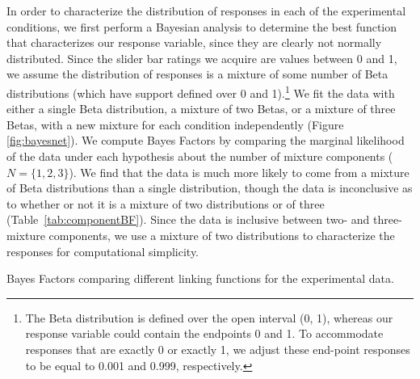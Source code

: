 \documentclass[10pt,letterpaper]{article}
\begin{document}
In order to characterize the distribution of responses in each of the experimental conditions, we first perform a Bayesian analysis to determine the best function that characterizes our response variable, since they are clearly not normally distributed.
Since the slider bar ratings we acquire are values between 0 and 1, we assume the distribution of responses is a mixture of some number of Beta distributions (which have support defined over 0 and 1).\footnote{The Beta distribution is defined over the open interval (0, 1), whereas our response variable could contain the endpoints 0 and 1. To accommodate responses that are exactly 0 or exactly 1, we adjust these end-point responses to be equal to 0.001 and 0.999, respectively.}
We fit the data with either a single Beta distribution, a mixture of two Betas, or a mixture of three Betas, with a new mixture for each condition independently (Figure \ref{fig:bayesnet}). 
We compute Bayes Factors by comparing the marginal likelihood of the data under each hypothesis about the number of mixture components ($N = \{1, 2, 3\}$).
We find that the data is much more likely to come from a mixture of Beta distributions than a single distribution, though the data is inconclusive as to whether or not it is a mixture of two distributions or of three (Table~\ref{tab:componentBF}). 
Since the data is inclusive between two- and three- mixture components, we use a mixture of two distributions to characterize the responses for computational simplicity. 


\begin{center}
  \begin{table}[h]
    \centering
    \caption{Bayes Factors comparing different linking functions for the experimental data.}
    \label{tab:componentBF}
  \end{table}
\end{center}
\end{document}
